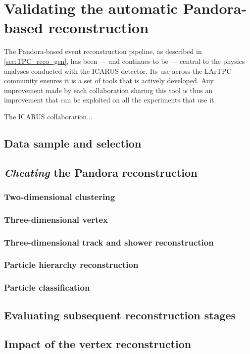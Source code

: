 
\chapter{Validating the automatic Pandora-based reconstruction}\label{chap:methods}

The Pandora-based event reconstruction pipeline, as described in \autoref{sec:TPC_reco_gen}, has been --- and continues to be --- central to the physics analyses conducted with the ICARUS detector. Its use across the LArTPC community ensures it is a set of tools that is actively developed. Any improvement made by each collaboration sharing this tool is thus an improvement that can be exploited on all the experiments that use it.

The ICARUS collaboration...

\section{Data sample and selection}



\section{\emph{Cheating} the Pandora reconstruction}

\subsection{Two-dimensional clustering}

\subsection{Three-dimensional vertex}

\subsection{Three-dimensional track and shower reconstruction}

\subsection{Particle hierarchy reconstruction}

\subsection{Particle classification}

\section{Evaluating subsequent reconstruction stages}

\section{Impact of the vertex reconstruction}